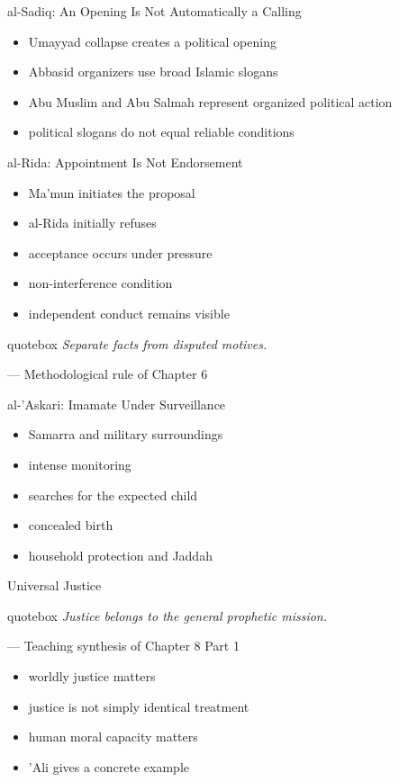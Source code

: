 \documentclass[11pt,aspectratio=169]{beamer}
\newcommand{\bigquote}[2]{%
\begin{beamercolorbox}[wd=\linewidth,sep=6pt]{quotebox}
{\large\itshape\color{deepteal}#1}\par
{\footnotesize --- #2}
\end{beamercolorbox}}
\begin{document}
\begin{frame}{al-Sadiq: An Opening Is Not Automatically a Calling}
\begin{itemize}
\item Umayyad collapse creates a political opening
\item Abbasid organizers use broad Islamic slogans
\item Abu Muslim and Abu Salmah represent organized political action
\item political slogans do not equal reliable conditions
\end{itemize}
\end{frame}

\begin{frame}{al-Rida: Appointment Is Not Endorsement}
\begin{itemize}
\item Ma'mun initiates the proposal
\item al-Rida initially refuses
\item acceptance occurs under pressure
\item non-interference condition
\item independent conduct remains visible
\end{itemize}
\bigquote{Separate facts from disputed motives.}{Methodological rule of Chapter 6}
\end{frame}

\begin{frame}{al-'Askari: Imamate Under Surveillance}
\begin{itemize}
\item Samarra and military surroundings
\item intense monitoring
\item searches for the expected child
\item concealed birth
\item household protection and Jaddah
\end{itemize}
\end{frame}

\begin{frame}{Universal Justice}
\bigquote{Justice belongs to the general prophetic mission.}{Teaching synthesis of Chapter 8 Part 1}
\begin{itemize}
\item worldly justice matters
\item justice is not simply identical treatment
\item human moral capacity matters
\item 'Ali gives a concrete example
\end{itemize}
\end{frame}
\end{document}
